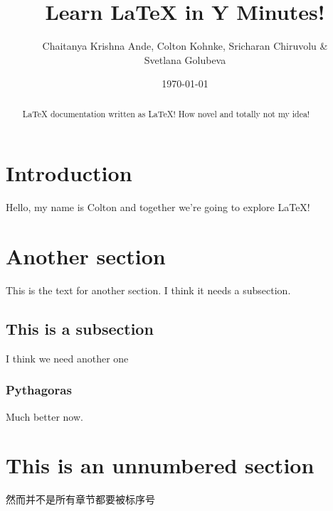 \documentclass[12pt]{article}
\author{Chaitanya Krishna Ande, Colton Kohnke, Sricharan Chiruvolu \& \\
Svetlana Golubeva}
\date{\today}
\title{Learn \LaTeX \hspace{1pt} in Y Minutes!}
\begin{document}
 
\maketitle

\newpage
\tableofcontents

\newpage

\begin{abstract}
 \LaTeX \hspace{1pt} documentation written as \LaTeX! How novel and totally not
 my idea!
\end{abstract}

\section{Introduction}
Hello, my name is Colton and together we're going to explore \LaTeX!

\section{Another section}
This is the text for another section. I think it needs a subsection.

\subsection{This is a subsection} %
I think we need another one

\subsubsection{Pythagoras}
Much better now.
\label{subsec:pythagoras}

\section*{This is an unnumbered section} 
然而并不是所有章节都要被标序号
\end{document}
